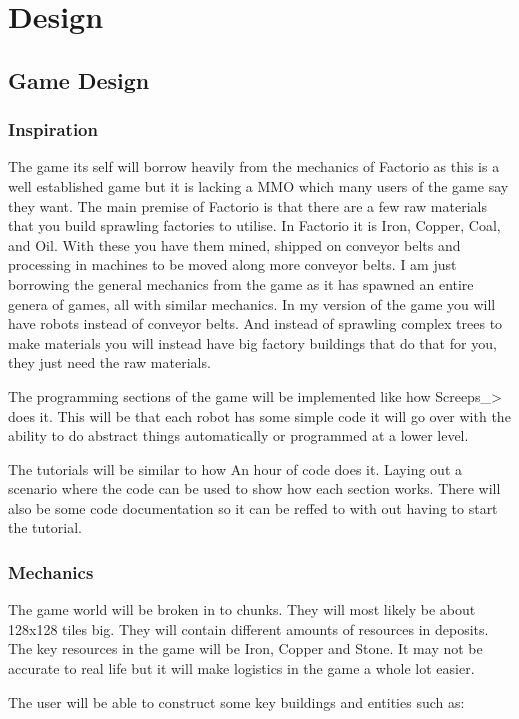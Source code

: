 \documentclass[12pt]{article}
\begin{document}
\newpage

\section{Design}
\subsection{Game Design}
\subsubsection{Inspiration}
The game its self will borrow heavily from the mechanics of Factorio as this is a well established game but it is lacking a MMO which many users of the game say they want. The main premise of Factorio is that there are a few raw materials that you build sprawling factories to utilise. In Factorio it is Iron, Copper, Coal, and Oil. With these you have them mined, shipped on conveyor belts and processing in machines to be moved along more conveyor belts. I am just borrowing the general mechanics from the game as it has spawned an entire genera of games, all with similar mechanics. In my version of the game you will have robots instead of conveyor belts. And instead of sprawling complex trees to make materials you will instead have big factory buildings that do that for you, they just need the raw materials.

The programming sections of the game will be implemented like how Screeps\_> does it. This will be that each robot has some simple code it will go over with the ability to do abstract things automatically or programmed at a lower level.

The tutorials will be similar to how An hour of code does it. Laying out a scenario where the code can be used to show how each section works. There will also be some code documentation so it can be reffed to with out having to start the tutorial.

\subsubsection{Mechanics}
The game world will be broken in to chunks. They will most likely be about 128x128 tiles big. They will contain different amounts of resources in deposits. The key resources in the game will be Iron, Copper and Stone. It may not be accurate to real life but it will make logistics in the game a whole lot easier.

The user will be able to construct some key buildings and entities such as:
\end{document}
